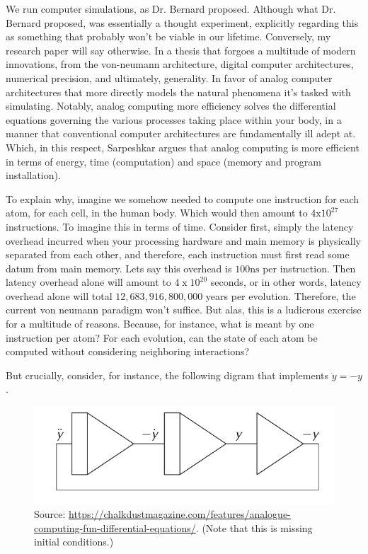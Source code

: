 We run computer simulations, as Dr. Bernard proposed. Although what Dr. Bernard proposed, was essentially a thought experiment, explicitly regarding this as something that probably won't be viable in our lifetime. Conversely, my research paper will say otherwise. In a thesis that forgoes a multitude of modern innovations, from the von-neumann architecture, digital computer architectures, numerical precision, and ultimately, generality. In favor of analog computer architectures that more directly models the natural phenomena it's tasked with simulating.  Notably, analog computing more efficiency solves the differential equations governing the various processes taking place within your body, in a manner that conventional computer architectures are fundamentally ill adept at. Which, in this respect, Sarpeshkar argues that analog computing is more efficient in terms of energy, time (computation) and space (memory and program installation).

To explain why, imagine we somehow needed to compute one instruction for each atom, for each cell, in the human body. Which would then amount to $4 \mathrm{x} 10^{27}$ instructions. To imagine this in terms of time. Consider first, simply the latency overhead incurred when your processing hardware and main memory is physically separated from each other, and therefore, each instruction must first read some datum from main memory. Lets say this overhead is $100\mathrm{ns}$ per instruction. Then latency overhead alone will amount to $4\;\mathrm{x}\;10^{20}$ seconds, or in other words, latency overhead alone will total $12,683,916,800,000$ years per evolution. Therefore, the current von neumann paradigm won't suffice. But alas, this is a ludicrous exercise for a multitude of reasons. Because, for instance, what is meant by one instruction per atom? For each evolution, can the state of each atom be computed without considering neighboring interactions?

But crucially, consider, for instance, the following digram that implements $\ddot{y} = -y$. 

\begin{figure}[H]
    \centering
    \includegraphics[width=0.6\linewidth]{../assets/analogue-computing-fun-differential-equations.png}
    \caption{Source: \url{https://chalkdustmagazine.com/features/analogue-computing-fun-differential-equations/}. (Note that this is missing initial conditions.)}
    \label{Image Label}
\end{figure}

